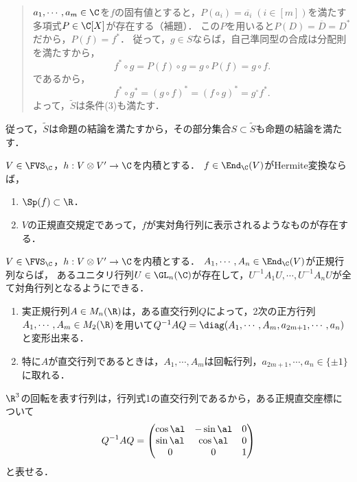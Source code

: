 \documentclass[uplatex, dvipdfmx]{jsreport}
\begin{document}
\begin{Proof}
\begin{description}
\begin{quotation}
            $a_1,\cdots,a_m\in\C$を$f$の固有値とすると，$P(a_i)=\overline{a_i}\;(i\in[m])$を満たす多項式$P\in\C[X]$が存在する（補題）．
            この$P$を用いると$P(D)=\overline{D}=D^*$だから，$P(f)=f^*$．
            従って，$g\in S$ならば，自己準同型の合成は分配則を満たすから，
            \[f^*\circ g=P(f)\circ g=g\circ P(f)=g\circ f.\]
            であるから，
            \[f^*\circ g^*=(g\circ f)^*=(f\circ g)^*=g^\circ f^*.\]
            よって，$\tilde{S}$は条件(3)も満たす．
        \end{quotation}
        従って，$\tilde{S}$は命題の結論を満たすから，その部分集合$S\subset\tilde{S}$も命題の結論を満たす．
    \end{description}
\end{Proof}

\begin{corollary}[Hermite変換は実多角化可能]
    $V\in\FVS_\C$，$h:V\otimes V'\to\C$を内積とする．
    $f\in\End_\C(V)$がHermite変換ならば，
    \begin{enumerate}
        \item $\Sp(f)\subset\R$．
        \item $V$の正規直交規定であって，$f$が実対角行列に表示されるようなものが存在する．
    \end{enumerate}
\end{corollary}

\begin{corollary}[正規行列は一斉対角化可能]
    $V\in\FVS_\C$，$h:V\otimes V'\to\C$を内積とする．
    $A_1,\cdots,A_n\in\End_\C(V)$が正規行列ならば，
    あるユニタリ行列$U\in\GL_n(\C)$が存在して，$U^{-1}A_1U,\cdots,U^{-1}A_nU$が全て対角行列となるようにできる．
\end{corollary}

\begin{remark}[実正規行列は実対角化不可能！]\mbox{}
    \begin{enumerate}
        \item 実正規行列$A\in M_n(\R)$は，ある直交行列$Q$によって，2次の正方行列$A_1,\cdots,A_m\in M_2(\R)$を用いて$Q^{-1}AQ=\diag(A_1,\cdots,A_m,a_{2m+1},\cdots,a_n)$と変形出来る．
        \item 特に$A$が直交行列であるときは，$A_1,\cdots,A_m$は回転行列，$a_{2m+1},\cdots,a_n\in\{\pm1\}$に取れる．
    \end{enumerate}
    $\R^3$の回転を表す行列は，行列式1の直交行列であるから，ある正規直交座標について
    \[Q^{-1}AQ=\begin{pmatrix}\cos\al&-\sin\al&0\\\sin\al&\cos\al&0\\0&0&1\end{pmatrix}\]
    と表せる．
\end{remark}
\end{document}
